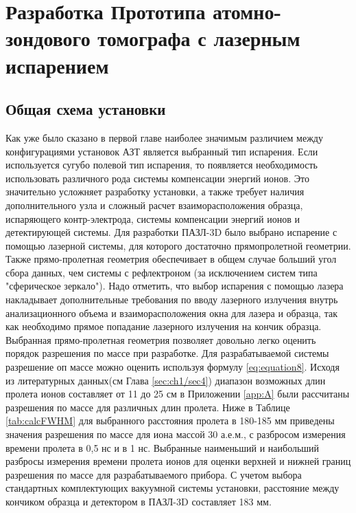 \chapter{Разработка  Прототипа атомно-зондового томографа с лазерным испарением}\label{ch:ch2}


\section{Общая схема установки}\label{sec:ch2/sec1}

Как уже было сказано в первой главе наиболее значимым различием между конфигурациями установок АЗТ является выбранный тип испарения. Если используется сугубо полевой тип испарения, то появляется необходимость использовать различного рода системы компенсации энергий ионов. Это значительно усложняет разработку установки, а также требует наличия дополнительного узла и сложный расчет взаиморасположения образца, испаряющего контр-электрода, системы компенсации энергий ионов и детектирующей системы. Для разработки ПАЗЛ-3D \cite{scbibAPPLE} было выбрано испарение с помощью лазерной системы, для которого достаточно прямопролетной геометрии. Также прямо-пролетная геометрия обеспечивает в общем случае больший угол сбора данных, чем системы с рефлектроном (за исключением систем типа "сферическое зеркало"). Надо отметить, что выбор испарения с помощью лазера накладывает дополнительные требования по вводу лазерного излучения внутрь анализационного объема и взаиморасположения окна для лазера и образца, так как необходимо прямое попадание лазерного излучения на кончик образца.
Выбранная прямо-пролетная геометрия позволяет довольно легко оценить порядок разрешения по массе при разработке. Для разрабатываемой системы разрешение оп массе можно оценить используя формулу \cref{eq:equation8}. Исходя из литературных данных(см Глава \cref{sec:ch1/sec4}) диапазон возможных длин пролета ионов составляет от 11 до 25 см в Приложении \cref{app:A} были рассчитаны разрешения по массе для различных длин пролета. Ниже в Таблице \cref{tab:calcFWHM} для выбранного расстояния пролета в 180-185 мм приведены значения разрешения по массе для иона массой 30 а.е.м., с разбросом измерения времени пролета в 0,5 нс и в 1 нс. Выбранные наименьший и наибольший разбросы измерения времени пролета ионов для оценки верхней и нижней границ разрешения по массе для разрабатываемого прибора. С учетом выбора стандартных комплектующих вакуумной системы установки, расстояние между кончиком образца и детектором в ПАЗЛ-3D составляет 183 мм.

